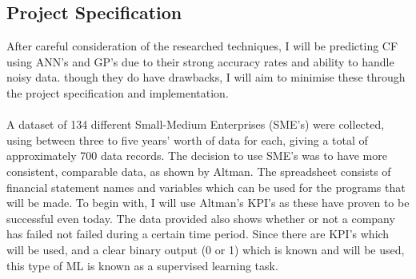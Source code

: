 \documentclass[11pt]{article}
\begin{document}
\subsection{Project Specification}
After careful consideration of the researched techniques, I will be predicting CF using ANN's and GP's due to their strong accuracy rates and ability to handle noisy data. though they do have drawbacks, I will aim to minimise these through the project specification and implementation.\\
\\
A dataset of 134 different Small-Medium Enterprises (SME's) were collected, using between three to five years' worth of data for each, giving a total of approximately 700 data records. The decision to use SME's was to have more consistent, comparable data, as shown by Altman. The spreadsheet consists of financial statement names and variables which can be used for the programs that will be made. To begin with, I will use Altman's KPI's as these have proven to be successful even today. 
The data provided also shows whether or not a company has failed not failed during a certain time period. Since there are KPI's which will be used, and a clear binary output (0 or 1) which is known and will be used, this type of ML is known as a supervised learning task. \\
\end{document}

